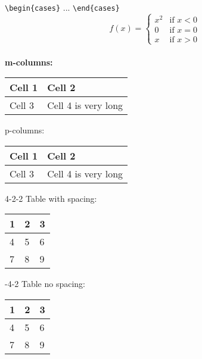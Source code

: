 	\noindent\hrulefill \\
	\verb|\begin{cases}| ... \verb|\end{cases}|
	\begin{equation}
	f(x) =
	\begin{cases}
		x^2 &\text{if } x<0 \\
		0 &\text{if } x=0 \\
		x &\text{if } x>0
	\end{cases}
	\end{equation}
	\noindent\hrulefill \\

	\clearpage
			\textbf{m-columns:} \\ \noindent
			\begin{tabular}{|m{2cm}|m{2cm}|}
				\hline 
				Cell 1 & Cell 2 \\
				\hline 
				Cell 3 & Cell 4 is very long \\
				\hline 
			\end{tabular}
			
			\bigbreak \noindent
			p-columns: \bigbreak \noindent
			\begin{tabular}{|p{2cm}|p{2cm}|}
				\hline 
				Cell 1 & Cell 2 \\
				\hline 
				Cell 3 & Cell 4 is very long \\
				\hline 
			\end{tabular}
		\mysubsection{Spacing}
			4-2-2 Table with spacing: \bigbreak \noindent
			\begin{tabular}{|p{4cm}|p{2cm}|p{2cm}|}
				\hline
				\rule{0pt}{0ex}
				1 & 2 & 3 \\[0ex]
				\hline
				\rule{0pt}{2.2ex}
				4 & 5 & 6 \\[1ex]
				\hline
				\rule{0pt}{4.2ex}
				7 & 8 & 9 \\[2ex]
				\hline
			\end{tabular}
			
			\bigbreak {}-4-2 Table no spacing: \bigbreak \noindent
			\begin{tabular}{|p{4cm}|p{2cm}|p{2cm}|}
				\hline
				1 & 2 & 3 \\
				\hline
				4 & 5 & 6 \\
				\hline
				7 & 8 & 9 \\
				\hline
			\end{tabular}
			
